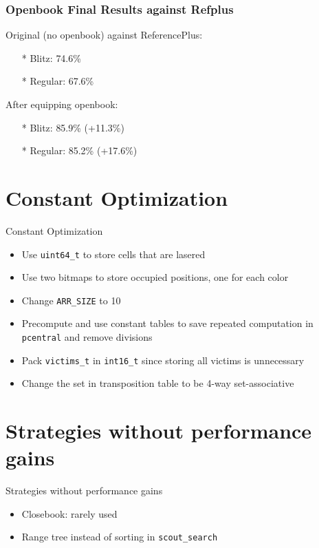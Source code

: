 \documentclass[10pt]{beamer}
\newcommand{\itema}{\item[*]}
\begin{document}
	\begin{frame}
		\frametitle{Openbook Final Results against Refplus}

		Original (no openbook) against ReferencePlus:
		\begin{itemize}
		\item[*] Blitz: \textcolor{dred}{74.6\%}
		\item[*] Regular: \textcolor{dred}{67.6\%}
		\end{itemize}
		\pause
		After equipping openbook:
		\begin{itemize}
		\item[*] Blitz: \textcolor{fgreen}{85.9\%} (\textcolor{fgreen}{+11.3\%})
		\item[*] Regular: \textcolor{fgreen}{85.2\%} (\textcolor{fgreen}{+17.6\%})
		\end{itemize}
	\end{frame}

	\section{Constant Optimization}
	\begin{frame}{Constant Optimization}
        \begin{itemize}
            \itema Use {\tt uint64\_t} to store cells that are lasered
            \itema Use two bitmaps to store occupied positions, one for each color
            \itema Change {\tt ARR\_SIZE} to 10
            \itema Precompute and use constant tables to save repeated computation in {\tt pcentral} and remove divisions
            \itema Pack {\tt victims\_t} in {\tt int16\_t} since storing all victims is unnecessary
            \itema Change the set in transposition table to be 4-way set-associative
        \end{itemize}
	\end{frame}


	\section{Strategies without performance gains}
	\begin{frame}{Strategies without performance gains}
	    \begin{itemize}
	        \itema Closebook: rarely used
	        \itema Range tree instead of sorting in  {\tt scout\_search}
	    \end{itemize}
	\end{frame}
\end{document}
